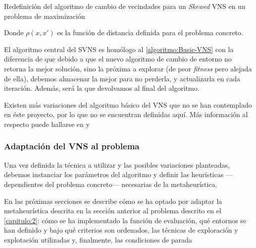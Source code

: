 \begin{algorithm}[h]
	\caption{Redefinición del algoritmo de cambio de vecindades para un \textit{Skewed} VNS en un problema de maximización}
	\label{algoritmo:SVNS-cambio-entornos}
	
	\DontPrintSemicolon
	\bigskip
	
	
\end{algorithm}

Donde $\rho(x,x')$ es la función de distancia definida para el problema concreto.

El algoritmo central del SVNS es homólogo al \autoref{algoritmo:Basic-VNS} con la diferencia de que debido a que el nuevo algoritmo de cambio de entorno no retorna la mejor solución, sino la próxima a explorar (de peor \textit{fitness} pero alejada de ella), debemos almacenar la mejor para no perderla, y actualizarla en cada iteración. Además, será la que devolvamos al final del algoritmo.

Existen más variaciones del algoritmo básico del VNS que no se han contemplado en éste proyecto, por lo que no se encuentran definidas aquí. Más información al respecto puede hallarse en \cite{vns} y \cite{info-adicional-vns}

\subsubsection{Adaptación del VNS al problema}
\label{apartado:adaptacion-VNS}

Una vez definida la técnica a utilizar y las posibles variaciones planteadas, debemos instanciar los parámetros del algoritmo y definir las heurísticas ---dependientes del problema concreto--- necesarias de la metaheurística.

En las próximas secciones se describe cómo se ha optado por adaptar la metaheurística descrita en la sección anterior al problema descrito en el \autoref{capitulo:2}: cómo se ha implementado la función de evaluación, qué entornos se han definido y bajo qué criterios son ordenados, las técnicas de exploración y explotación utilizadas y, finalmente, las condiciones de parada

